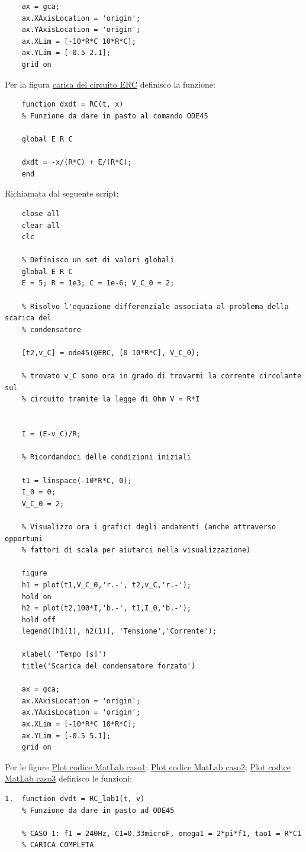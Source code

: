 \documentclass[a4paper, 12pt, twoside]{report}
\begin{document}
{\begin{verbatim}
	ax = gca;
	ax.XAxisLocation = 'origin';
	ax.YAxisLocation = 'origin';
	ax.XLim = [-10*R*C 10*R*C];
	ax.YLim = [-0.5 2.1];
	grid on 
\end{verbatim}

Per la figura \hyperref[fig:PLOTERC]{carica del circuito ERC} definisco la funzione:
\begin{verbatim}
	function dxdt = RC(t, x)
	% Funzione da dare in pasto al comando ODE45
	
	global E R C
	
	dxdt = -x/(R*C) + E/(R*C);
	end
\end{verbatim}
Richiamata dal seguente script:
\begin{verbatim}
	close all
	clear all
	clc
	
	% Definisco un set di valori globali
	global E R C
	E = 5; R = 1e3; C = 1e-6; V_C_0 = 2;
	
	% Risolvo l'equazione differenziale associata al problema della scarica del
	% condensatore
	
	[t2,v_C] = ode45(@ERC, [0 10*R*C], V_C_0);
	
	% trovato v_C sono ora in grado di trovarmi la corrente circolante sul
	% circuito tramite la legge di Ohm V = R*I
	
	
	I = (E-v_C)/R;
	
	% Ricordandoci delle condizioni iniziali 
	
	t1 = linspace(-10*R*C, 0);
	I_0 = 0;
	V_C_0 = 2;
	
	% Visualizzo ora i grafici degli andamenti (anche attraverso opportuni
	% fattori di scala per aiutarci nella visualizzazione)
	
	figure
	h1 = plot(t1,V_C_0,'r.-', t2,v_C,'r.-');
	hold on
	h2 = plot(t2,100*I,'b.-', t1,I_0,'b.-');
	hold off
	legend([h1(1), h2(1)], 'Tensione','Corrente');
	
	xlabel( 'Tempo [s]')
	title('Scarica del condensatore forzato')
	
	ax = gca;
	ax.XAxisLocation = 'origin';
	ax.YAxisLocation = 'origin';
	ax.XLim = [-10*R*C 10*R*C];
	ax.YLim = [-0.5 5.1];
	grid on 
\end{verbatim}

Per le figure \hyperref[fig:sub2]{Plot codice MatLab caso1};  \hyperref[fig:sub4]{Plot codice MatLab caso2}; \hyperref[fig:sub6]{Plot codice MatLab caso3} definisco le funzioni:
\begin{verbatim}
1.  function dvdt = RC_lab1(t, v)
    % Funzione da dare in pasto ad ODE45

    % CASO 1: f1 = 240Hz, C1=0.33microF, omega1 = 2*pi*f1, tao1 = R*C1
    % CARICA COMPLETA


\end{verbatim}}
\end{document}
